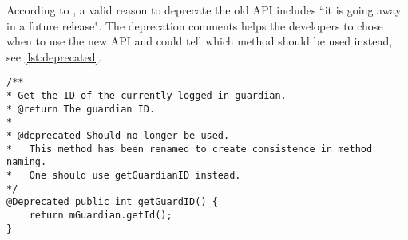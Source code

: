 According to \citet{deprecatedreference}, a valid reason to deprecate the old API includes ``it is going away in a future release". The deprecation comments helps the developers to chose when to use the new API and could tell which method should be used instead, see \cref{lst:deprecated}.

\begin{lstlisting}[caption={Example of a deprecated method could look like this.}, label={lst:deprecated}]
/**
* Get the ID of the currently logged in guardian.
* @return The guardian ID.
* 
* @deprecated Should no longer be used.
* 	This method has been renamed to create consistence in method naming.
*	One should use getGuardianID instead.
*/
@Deprecated public int getGuardID() {
	return mGuardian.getId();
}
\end{lstlisting}